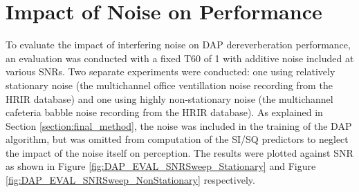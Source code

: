 



\section{Impact of Noise on Performance}

To evaluate the impact of interfering noise on DAP dereverberation performance, an evaluation was conducted with a fixed T60 of \qty{1}{\sec} with additive noise included at various SNRs. Two separate experiments were conducted: one using relatively stationary noise (the multichannel office ventillation noise recording from the HRIR database) and one using highly non-stationary noise (the multichannel cafeteria babble noise recording from the HRIR database). As explained in Section \ref{section:final_method}, the noise was included in the training of the DAP algorithm, but was omitted from computation of the SI/SQ predictors to neglect the impact of the noise itself on perception. The results were plotted against SNR as shown in Figure \ref{fig:DAP_EVAL_SNRSweep_Stationary} and Figure \ref{fig:DAP_EVAL_SNRSweep_NonStationary} respectively.



